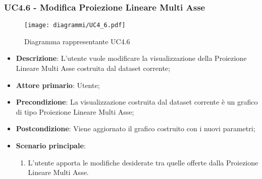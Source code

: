\newpage
\subsubsection{UC4.6 - Modifica Proiezione Lineare Multi Asse}
\label{ssub:uc4.6}
\begin{figure}[h]
    \centering
    \texttt{[image: diagrammi/UC4\_6.pdf]}
    \caption{Diagramma rappresentante UC4.6}
    \label{fig:UC4.6}
\end{figure}

\begin{itemize}
    \item \textbf{Descrizione}: L’utente vuole modificare la visualizzazione della Proiezione Lineare Multi Asse
                                costruita dal dataset corrente;

    \item \textbf{Attore primario}: Utente;

    \item \textbf{Precondizione}:   La visualizzazione costruita dal dataset corrente è un grafico di tipo Proiezione Lineare Multi Asse;
    \item \textbf{Postcondizione}:  Viene aggiornato il grafico costruito con i nuovi parametri;

	\item \textbf{Scenario principale}:
		\begin{enumerate}
            \item L'utente apporta le modifiche desiderate tra quelle offerte dalla Proiezione Lineare Multi Asse.
        \end{enumerate}
\end{itemize}

